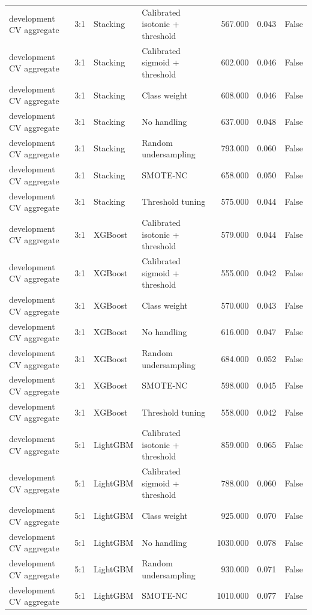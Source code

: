 \begin{tabular}{llllrrr}
development CV aggregate & 3:1 & Stacking & Calibrated isotonic + threshold & 567.000 & 0.043 & False \\
development CV aggregate & 3:1 & Stacking & Calibrated sigmoid + threshold & 602.000 & 0.046 & False \\
development CV aggregate & 3:1 & Stacking & Class weight & 608.000 & 0.046 & False \\
development CV aggregate & 3:1 & Stacking & No handling & 637.000 & 0.048 & False \\
development CV aggregate & 3:1 & Stacking & Random undersampling & 793.000 & 0.060 & False \\
development CV aggregate & 3:1 & Stacking & SMOTE-NC & 658.000 & 0.050 & False \\
development CV aggregate & 3:1 & Stacking & Threshold tuning & 575.000 & 0.044 & False \\
development CV aggregate & 3:1 & XGBoost & Calibrated isotonic + threshold & 579.000 & 0.044 & False \\
development CV aggregate & 3:1 & XGBoost & Calibrated sigmoid + threshold & 555.000 & 0.042 & False \\
development CV aggregate & 3:1 & XGBoost & Class weight & 570.000 & 0.043 & False \\
development CV aggregate & 3:1 & XGBoost & No handling & 616.000 & 0.047 & False \\
development CV aggregate & 3:1 & XGBoost & Random undersampling & 684.000 & 0.052 & False \\
development CV aggregate & 3:1 & XGBoost & SMOTE-NC & 598.000 & 0.045 & False \\
development CV aggregate & 3:1 & XGBoost & Threshold tuning & 558.000 & 0.042 & False \\
development CV aggregate & 5:1 & LightGBM & Calibrated isotonic + threshold & 859.000 & 0.065 & False \\
development CV aggregate & 5:1 & LightGBM & Calibrated sigmoid + threshold & 788.000 & 0.060 & False \\
development CV aggregate & 5:1 & LightGBM & Class weight & 925.000 & 0.070 & False \\
development CV aggregate & 5:1 & LightGBM & No handling & 1030.000 & 0.078 & False \\
development CV aggregate & 5:1 & LightGBM & Random undersampling & 930.000 & 0.071 & False \\
development CV aggregate & 5:1 & LightGBM & SMOTE-NC & 1010.000 & 0.077 & False \\

\end{tabular}
